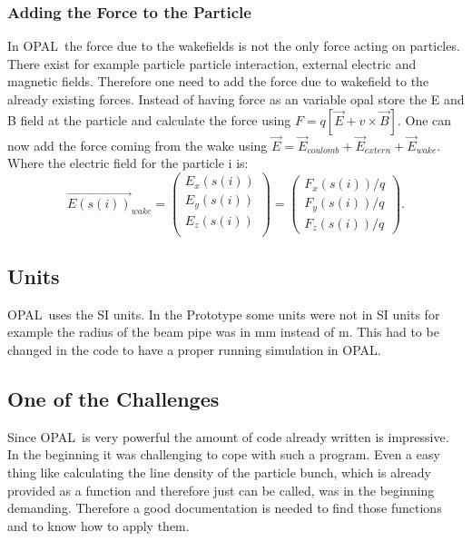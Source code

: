 \documentclass[11pt,a4paper]{article}
\newcommand{\opal}{\textsc{OPAL}}
\begin{document}
\subsubsection{Adding the Force to the Particle}
In \opal\ the force due to the wakefields is not the only force acting on particles. There exist for example particle particle interaction, external electric and magnetic fields. Therefore one need to add the force due to wakefield to the already existing forces. Instead of having force as an variable opal store the E and B field at the particle and calculate the force using $F = q[\vec{E}+v\times\vec{B}]$. One can now add the force coming from the wake using $\vec{E} = \vec{E}_{coulomb} + \vec{E}_{extern} + \vec{E}_{wake}$.
Where the electric field for the particle i is:
\begin{equation} \vec{E(s(i))}_{wake} =  \left( \begin{array}{c}
 E_x(s(i))  \\  E_y(s(i))  \\  E_z(s(i))  \\
\end{array} \right)
=  \left( \begin{array}{c} F_x(s(i))/q \\  F_y(s(i))/q \\  F_z(s(i))/q
\end{array} \right).
\end{equation}

\subsection{Units}
\label{sec:units}
\opal\ uses the SI units. In the Prototype some units were not in SI units for example the radius of the beam pipe was in mm instead of m. This had to be changed in the code to have a proper running simulation in \opal.


\subsection{One of the Challenges}
Since \opal\ is very powerful the amount of code already written is impressive. In the beginning it was challenging to cope with such a program. Even a easy thing like calculating the line density of the particle bunch, which is already provided as a function and therefore just can be called, was in the beginning demanding. Therefore a good documentation is needed to find those functions and to know how to apply them.
\end{document}
